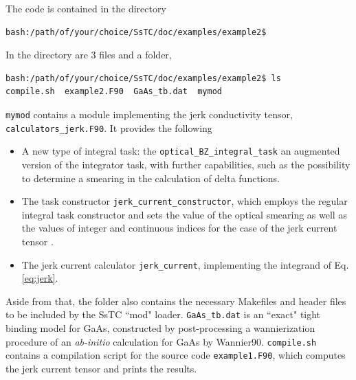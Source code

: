 \documentclass[10pt,a4paper]{article}
\begin{document}
The code is contained in the directory
\begin{codebox}{}
\begin{verbatim}
bash:/path/of/your/choice/SsTC/doc/examples/example2$
\end{verbatim}
\end{codebox}
In the directory are 3 files and a folder,
\begin{codebox}{}
\begin{verbatim}
bash:/path/of/your/choice/SsTC/doc/examples/example2$ ls
compile.sh  example2.F90  GaAs_tb.dat  mymod
\end{verbatim}
\end{codebox}
\verb|mymod| contains a module implementing the jerk conductivity tensor, \verb|calculators_jerk.F90|. It provides the following
\begin{tcolorbox}
\begin{itemize}
\item A new type of integral task: the \verb|optical_BZ_integral_task| an augmented version of the integrator task, with further capabilities, such as the possibility to determine a smearing in the calculation of delta functions.
\item The task constructor \verb|jerk_current_constructor|, which employs the regular integral task constructor and sets the value of the optical smearing as well as the values of integer and continuous indices for the case of the jerk current tensor .
\item The jerk current calculator \verb|jerk_current|, implementing the integrand of Eq. \eqref{eq:jerk}.
\end{itemize}
\end{tcolorbox}
Aside from that, the folder also contains the necessary Makefiles and header files to be included by the SsTC ``mod" loader. \verb|GaAs_tb.dat| is an ``exact" tight binding model for GaAs, constructed by post-processing a wannierization procedure of an \textit{ab-initio} calculation for GaAs by Wannier90. \verb|compile.sh| contains a compilation script for the source code \verb|example1.F90|, which computes the jerk current tensor and prints the results.
\end{document}
